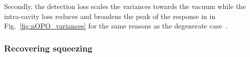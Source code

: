 Secondly, the detection loss scales the variances towards the vacuum while the intra-cavity loss reduces and broadens the peak of the response in in Fig.~\ref{fig:nOPO_variances} for the same reasons as the degenerate case~\cite{}.

\subsubsection{Recovering squeezing}
\label{sec:nOPO_combined_readout}


